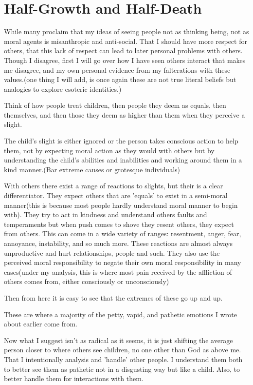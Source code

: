 \section{Half-Growth and Half-Death}
\par While many proclaim that my ideas of seeing people not as thinking being, not as moral agents is misanthropic and anti-social. That I should have more respect for others, that this lack of respect can lead to later personal problems with others. Though I disagree, first I will go over how I have seen others interact that makes me disagree, and my own personal evidence from my falterations with these values.(one thing I will add, is once again these are not true literal beliefs but analogies to explore esoteric identities.)
\par Think of how people treat children, then people they deem as equals, then themselves, and then those they deem as higher than them when they perceive a slight. 
\par The child's slight is either ignored or the person takes conscious action to help them, not by expecting moral action as they would with others but by understanding the child's abilities and inabilities and working around them in a kind manner.(Bar extreme causes or grotesque individuals)
\par With others there exist a range of reactions to slights, but their is a clear differentiator. They expect others that are 'equals' to exist in a semi-moral manner(this is because most people hardly understand moral manner to begin with). They try to act in kindness and understand others faults and temperaments but when push comes to shove they resent others, they expect from others. This can come in a wide variety of ranges: resentment, anger, fear, annoyance, instability, and so much more. These reactions are almost always unproductive and hurt relationships, people and such. They also use the perceived moral responsibility to negate their own moral responsibility in many cases(under my analysis, this is where most pain received by the affliction of others comes from, either consciously or unconsciously)
\par Then from here it is easy to see that the extremes of these go up and up. 
\par These are where a majority of the petty, vapid, and pathetic emotions I wrote about earlier come from.
\par Now what I suggest isn't as radical as it seems, it is just shifting the average person closer to where others see children, no one other than God as above me. That I intentionally analysis and 'handle' other people. I understand them both to better see them as pathetic not in a disgusting way but like a child. Also, to better handle them for interactions with them.

